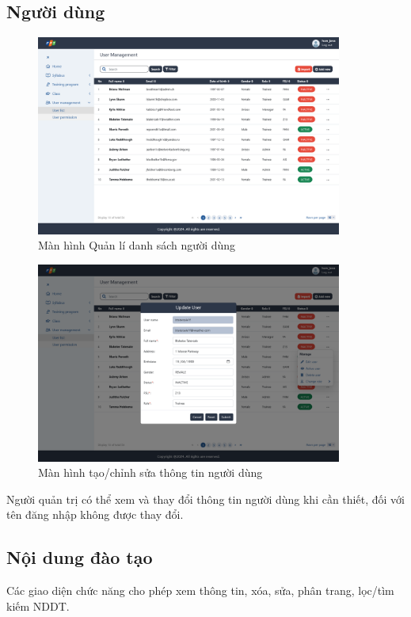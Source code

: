 \documentclass[report.tex]{subfiles}
\begin{document}
\subsection{Người dùng}

\begin{figure}[!htb]
{\centering
\includegraphics[width=380px]{../meta/ui.user-list.png}
\caption{Màn hình Quản lí danh sách người dùng}
\par
}
\end{figure}
\FloatBarrier

\begin{figure}[!htb]
{\centering
\includegraphics[width=380px]{../meta/ui.user-admin-update.png}
\caption{Màn hình tạo/chỉnh sửa thông tin người dùng}
\par
}
\end{figure}
\FloatBarrier

Người quản trị có thể xem và thay đổi thông tin người dùng khi cần thiết,
đối với tên đăng nhập không được thay đổi.

\subsection{Nội dung đào tạo}

Các giao diện chức năng cho phép xem thông tin, xóa, sửa, phân trang, lọc/tìm kiếm
NDDT.
\end{document}

